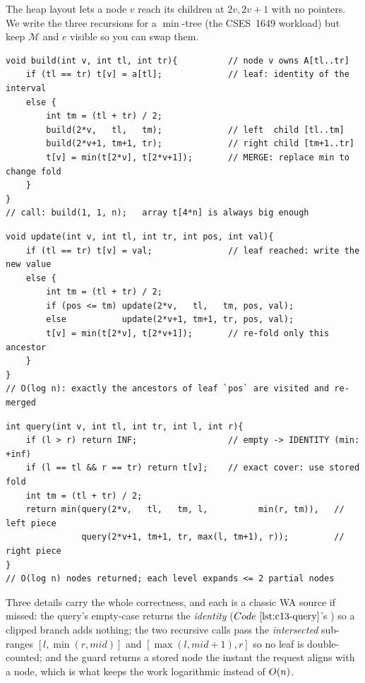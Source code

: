 The heap layout lets a node \(v\) reach its children at \(2v,2v{+}1\) with no
pointers.  We write the three recursions for a \(\min\)-tree (the CSES~1649
workload) but keep \(\mathcal{M}\) and \(e\) visible so you can swap them.

\begin{lstlisting}[caption={build: fold leaves up to the root, O(n)}, label={lst:c13-build}]
void build(int v, int tl, int tr){          // node v owns A[tl..tr]
    if (tl == tr) t[v] = a[tl];             // leaf: identity of the interval
    else {
        int tm = (tl + tr) / 2;
        build(2*v,   tl,   tm);             // left  child [tl..tm]
        build(2*v+1, tm+1, tr);             // right child [tm+1..tr]
        t[v] = min(t[2*v], t[2*v+1]);       // MERGE: replace min to change fold
    }
}
// call: build(1, 1, n);   array t[4*n] is always big enough
\end{lstlisting}

\begin{lstlisting}[caption={point update: set A[pos]=val, retrace one root path}, label={lst:c13-update}]
void update(int v, int tl, int tr, int pos, int val){
    if (tl == tr) t[v] = val;               // leaf reached: write the new value
    else {
        int tm = (tl + tr) / 2;
        if (pos <= tm) update(2*v,   tl,   tm, pos, val);
        else           update(2*v+1, tm+1, tr, pos, val);
        t[v] = min(t[2*v], t[2*v+1]);       // re-fold only this ancestor
    }
}
// O(log n): exactly the ancestors of leaf `pos` are visited and re-merged
\end{lstlisting}

\begin{lstlisting}[caption={range query: fold the canonical cover of [l..r]}, label={lst:c13-query}]
int query(int v, int tl, int tr, int l, int r){
    if (l > r) return INF;                  // empty -> IDENTITY (min: +inf)
    if (l == tl && r == tr) return t[v];    // exact cover: use stored fold
    int tm = (tl + tr) / 2;
    return min(query(2*v,   tl,   tm, l,          min(r, tm)),   // left piece
               query(2*v+1, tm+1, tr, max(l, tm+1), r));         // right piece
}
// O(log n) nodes returned; each level expands <= 2 partial nodes
\end{lstlisting}

Three details carry the whole correctness, and each is a classic WA source if
missed: the query's empty-case returns the \emph{identity} (\(\coderef{c13-query}\)'s
) so a clipped branch adds nothing; the two recursive calls pass the
\emph{intersected} sub-ranges \([l,\min(r,mid)]\) and \([\max(l,mid{+}1),r]\)
so no leaf is double-counted; and the guard  returns a
stored node the instant the request aligns with a node, which is what keeps the
work logarithmic instead of \(O(n)\).

